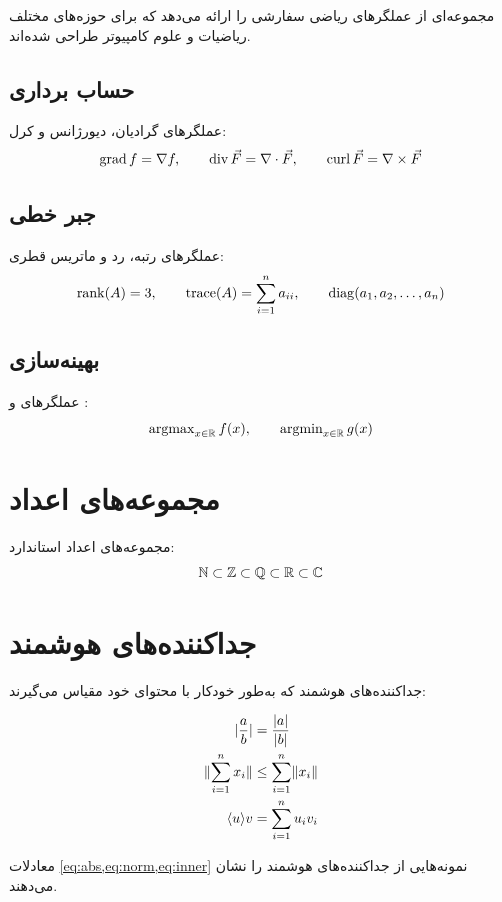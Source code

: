 \documentclass{matinbook}
\begin{document}
 مجموعه‌ای از عملگرهای ریاضی سفارشی را ارائه می‌دهد
که برای حوزه‌های مختلف ریاضیات و علوم کامپیوتر طراحی شده‌اند.

\subsection{حساب برداری}

عملگرهای گرادیان، دیورژانس و کرل:
\[
    \operatorname{grad} f = \nabla f, \qquad
    \operatorname{div} \vec{F} = \nabla \cdot \vec{F}, \qquad
    \operatorname{curl} \vec{F} = \nabla \times \vec{F}
\]

\subsection{جبر خطی}

عملگرهای رتبه، رد و ماتریس قطری:
\[
    \operatorname{rank}(A) = 3, \qquad
    \operatorname{trace}(A) = \sum_{i=1}^{n} a_{ii}, \qquad
    \operatorname{diag}(a_1, a_2, \ldots, a_n)
\]

\subsection{بهینه‌سازی}

عملگرهای  و :
\[
    \operatorname{argmax}_{x \in \mathbb{R}} f(x), \qquad \operatorname{argmin}_{x \in \mathbb{R}} g(x)
\]

\section{مجموعه‌های اعداد}
\label{sec:math-numbers}

مجموعه‌های اعداد استاندارد:
\[
    \mathbb{N} \subset \mathbb{Z} \subset \mathbb{Q} \subset \mathbb{R} \subset \mathbb{C}
\]

\section{جداکننده‌های هوشمند}
\label{sec:math-delimiters}

جداکننده‌های هوشمند که به‌طور خودکار با محتوای خود مقیاس می‌گیرند:

\begin{align}
    \lvert\frac{a}{b}\rvert &= \frac{\lvert a\rvert}{\lvert b\rvert} \label{eq:abs} \\
    \lVert\sum_{i=1}^{n} x_i\rVert &\leq \sum_{i=1}^{n} \lVert x_i\rVert \label{eq:norm} \\
    \langle u\rangle{v} &= \sum_{i=1}^{n} u_i v_i \label{eq:inner}
\end{align}

معادلات \cref{eq:abs,eq:norm,eq:inner} نمونه‌هایی از
جداکننده‌های هوشمند را نشان می‌دهند.
\end{document}
